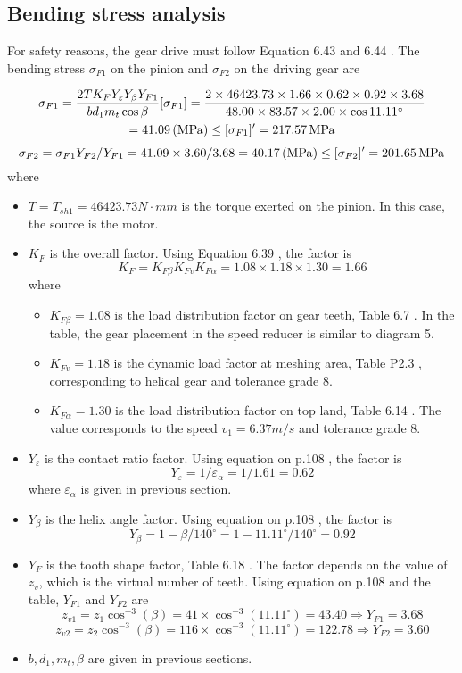 \subsection{Bending stress analysis}
For safety reasons, the gear drive must follow Equation 6.43 and 6.44 \cite{tk1}. The bending stress $ \sigma_{F1} $ on the pinion and $ \sigma_{F2} $ on the driving gear are

\begin{multline*}
	\sigma_{F1} = \dfrac{2TK_FY_\varepsilon Y_\beta Y_{F1}}{bd_1m_t\cos\beta} [\sigma_{F1}]= \dfrac{2\times 46423.73 \times 1.66 \times 0.62 \times 0.92 \times 3.68}{48.00 \times 83.57 \times 2.00 \times\cos 11.11^\circ}\\
	= 41.09 \, (\mathrm{MPa}) \leq [\sigma_{F1}]' = 217.57 \, \mathrm{MPa}
\end{multline*}
\[\sigma_{F2} = \sigma_{F1}Y_{F2}/Y_{F1} = {41.09 \times 3.60}/3.68 = 40.17 \, (\mathrm{MPa}) \leq [\sigma_{F2}]' = 201.65 \, \mathrm{MPa}\]
where
\begin{itemize}
	\item $ T=T_{sh1}=46423.73\unit{N\cdot mm} $ is the torque exerted on the pinion. In this case, the source is the motor.
	\item $ K_F $ is the overall factor. Using Equation 6.39 \cite{tk1}, the factor is
	\[ K_F = K_{F\beta}K_{Fv}K_{F\alpha} = 1.08 \times 1.18 \times 1.30 = 1.66 \]
	where
	\begin{itemize}
		\item $ K_{F\beta} = 1.08 $ is the load distribution factor on gear teeth, Table 6.7 \cite{tk1}. In the table, the gear placement in the speed reducer is similar to diagram 5.
		\item $ K_{Fv} = 1.18 $ is the dynamic load factor at meshing area, Table P2.3 \cite{tk1}, corresponding to helical gear and tolerance grade 8.
		\item $ K_{F\alpha} = 1.30 $ is the load distribution factor on top land, Table 6.14 \cite{tk1}. The value corresponds to the speed $ v_1=6.37 \unit{m/s} $ and tolerance grade 8.
	\end{itemize}
	\item $ Y_\varepsilon $ is the contact ratio factor. Using equation on p.108 \cite{tk1}, the factor is
	\[ Y_\varepsilon = 1/\varepsilon_\alpha = 1/1.61 = 0.62 \]
	where $ \varepsilon_\alpha $ is given in previous section.
	\item $ Y_\beta $ is the helix angle factor. Using equation on p.108 \cite{tk1}, the factor is
	\[ Y_\beta = 1-{\beta}/{140^\circ}=  1-{11.11^\circ}/{140^\circ}= 0.92 \]
	\item $ Y_F $ is the tooth shape factor, Table 6.18 \cite{tk1}. The factor depends on the value of $ z_v $, which is the virtual number of teeth. Using equation on p.108 \cite{tk1} and the table, $ Y_{F1} $ and $ Y_{F2} $ are
	\[ z_{v1} = z_1\cos^{-3}(\beta) = 41\times\cos^{-3}(11.11^\circ) = 43.40\Rightarrow Y_{F1} = 3.68\]
	\[ z_{v2} = z_2\cos^{-3}(\beta) = 116\times\cos^{-3}(11.11^\circ) = 122.78\Rightarrow Y_{F2} = 3.60\]
	\item $ b,d_1,m_t,\beta $ are given in previous sections.
\end{itemize}

